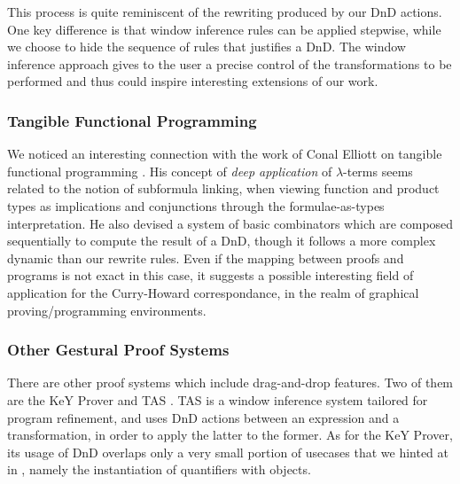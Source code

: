 This process is quite reminiscent of the rewriting produced by our DnD
actions.  One key difference is that window inference rules can be
applied stepwise, while we choose to hide the sequence of rules that
justifies a DnD. The window inference approach gives to the user a
precise control of the transformations to be performed and thus could
inspire interesting extensions of our work.


\subsubsection*{Tangible Functional Programming}
We noticed an interesting connection with the work of Conal Elliott on
tangible functional programming \cite{elliott-tangible}. His concept
of \emph{deep application} of $\lambda$-terms seems related to the
notion of subformula linking, when viewing function and product types
as implications and conjunctions through the formulae-as-types
interpretation. He also devised a system of basic combinators which
are composed sequentially to compute the result of a DnD, though it
follows a more complex dynamic than our rewrite rules. Even if the
mapping between proofs and programs is not exact in this case, it
suggests a possible interesting field of application for the
Curry-Howard correspondance, in the realm of graphical
proving/programming environments.

\subsubsection*{Other Gestural Proof Systems}
There are other proof systems which include drag-and-drop features. Two of them
are the KeY Prover \cite{ahrendt-using-2016} and TAS \cite{goos-tas-2000}. TAS
is a window inference system tailored for program refinement, and uses DnD
actions between an expression and a transformation, in order to apply the latter
to the former.
As for the KeY Prover, its usage of DnD overlaps only a very small
portion of usecases that we hinted at in , namely
the instantiation of quantifiers with objects.

